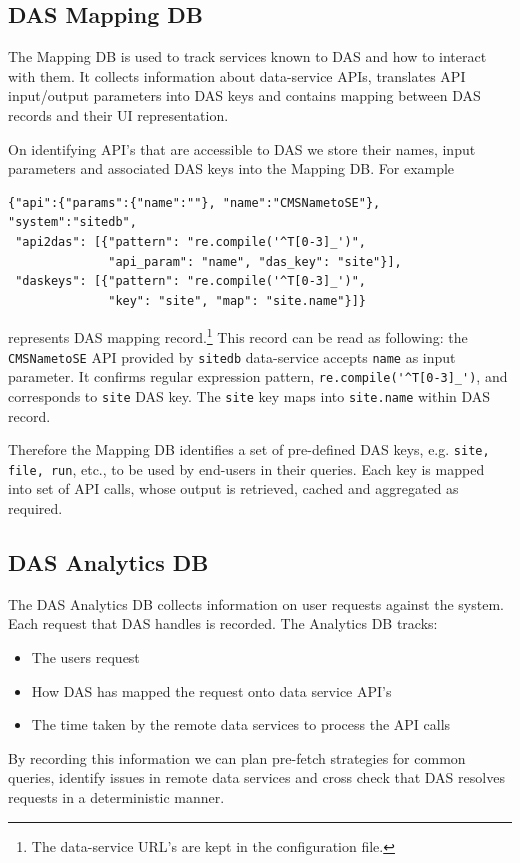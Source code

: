 \documentclass[1p,times]{elsarticle}
\begin{document}
\subsection{DAS Mapping DB\label{MappingDB}}
The Mapping DB is used to track services known to DAS and how to interact with them.
It collects
information about data-service APIs, translates API input/output
parameters into DAS keys and contains mapping between DAS records
and their UI representation.

On identifying API's that are accessible to DAS we store
their names, input parameters and associated DAS keys
into the Mapping DB. For example
\begin{verbatim}
{"api":{"params":{"name":""}, "name":"CMSNametoSE"}, "system":"sitedb",
 "api2das": [{"pattern": "re.compile('^T[0-3]_')", 
              "api_param": "name", "das_key": "site"}], 
 "daskeys": [{"pattern": "re.compile('^T[0-3]_')", 
              "key": "site", "map": "site.name"}]}
\end{verbatim}
represents DAS mapping record.\footnote{
The data-service URL's are kept in the configuration file.
}
This record can be read as following:
the \verb+CMSNametoSE+ API provided by 
\verb+sitedb+ data-service accepts \verb+name+ as input parameter. It
confirms regular expression pattern, \verb+re.compile('^T[0-3]_')+, and
corresponds to \verb+site+ DAS key. The \verb+site+ key
maps into \verb+site.name+ within DAS record. 

Therefore the Mapping DB identifies a set of pre-defined DAS keys, 
e.g. \verb+site, file, run+, etc., to be used by end-users in their queries.
Each key is mapped into set of API calls, whose output is retrieved,
cached and aggregated as required. 

\subsection{DAS Analytics DB}
The DAS Analytics DB collects information on user requests against the system.
Each request that DAS handles is recorded.
The Analytics DB tracks:
\begin{itemize}
\item The users request
\item How DAS has mapped the request onto data service API's
\item The time taken by the remote data services to process the API calls
\end{itemize}
By recording this information we can plan pre-fetch strategies for common queries,
identify issues in remote data services and cross check that DAS resolves requests
in a deterministic manner.
\end{document}
